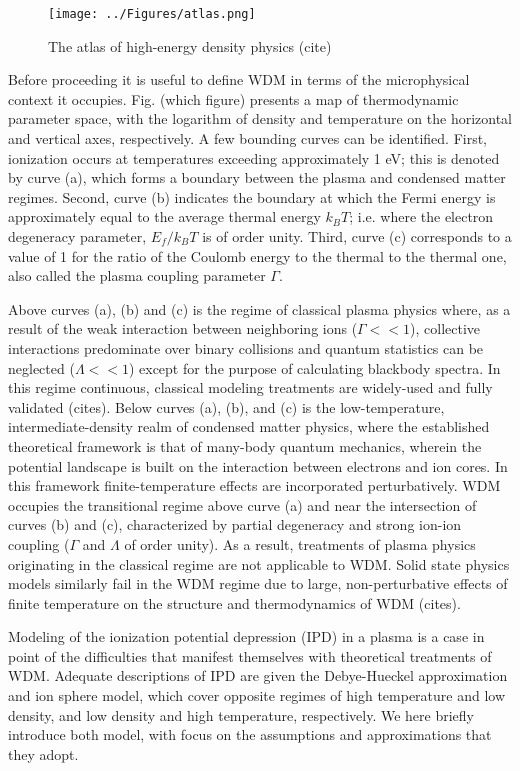\begin{figure}[h] \label{fig:atlas}
\caption{The atlas of high-energy density physics (cite)}
\centering
\texttt{[image: ../Figures/atlas.png]}
\end{figure}

Before proceeding it is useful to define WDM in terms of the microphysical context it occupies. Fig. (which figure) presents a map of thermodynamic parameter space, with the logarithm of density and temperature on the horizontal and vertical axes, respectively. A few bounding curves can be identified. First, ionization occurs at temperatures exceeding approximately 1 eV; this is denoted by curve (a), which forms a boundary between the plasma and condensed matter regimes. Second, curve (b) indicates the boundary at which the Fermi energy is approximately equal to the average thermal energy $k_BT$; i.e. where the electron degeneracy parameter, $E_f/k_B T$ is of order unity. Third, curve (c) corresponds to a value of 1 for the ratio of the Coulomb energy to the thermal to the thermal one, also called the plasma coupling parameter  $\Gamma$. 

Above curves (a), (b) and (c) is the regime of classical plasma physics where, as a result of the weak interaction between neighboring ions ($\Gamma << 1$), collective interactions predominate over binary collisions and quantum statistics can be neglected ($\Lambda << 1$) except for the purpose of calculating blackbody spectra. In this regime continuous, classical modeling treatments are widely-used and fully validated (cites). Below curves (a), (b), and (c) is the low-temperature, intermediate-density realm of condensed matter physics, where the established theoretical framework is that of many-body quantum mechanics, wherein the potential landscape is built on the interaction between electrons and ion cores. In this framework finite-temperature effects are incorporated perturbatively. WDM occupies the transitional regime above curve (a) and near the intersection of curves (b) and (c), characterized by partial degeneracy and strong ion-ion coupling ($\Gamma$ and $\Lambda$ of order unity). As a result, treatments of plasma physics originating in the classical regime are not applicable to WDM. Solid state physics models similarly fail in the WDM regime due to large, non-perturbative effects of finite temperature on the structure and thermodynamics of WDM (cites).  

Modeling of the ionization potential depression (IPD) in a plasma is a case in point of the difficulties that manifest themselves with theoretical treatments of WDM. Adequate descriptions of IPD are given the Debye-Hueckel approximation and ion sphere model, which cover opposite regimes of high temperature and low density, and low density and high temperature, respectively. We here briefly introduce both model, with focus on the assumptions and approximations that they adopt.

